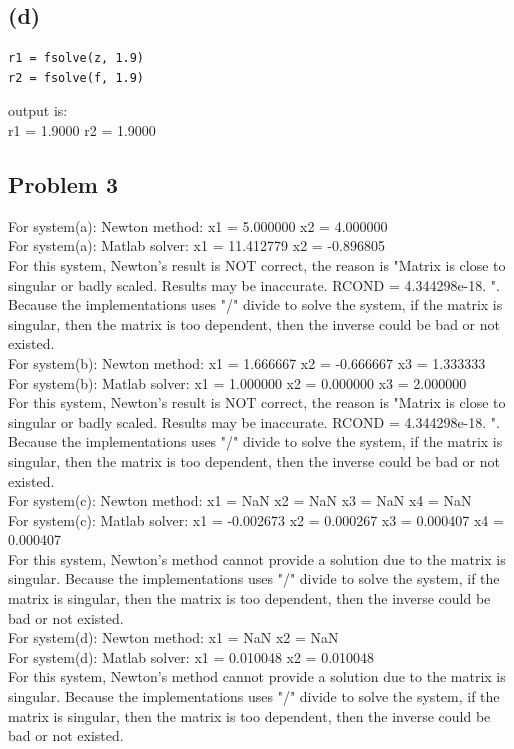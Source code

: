 \documentclass[11pt,fleqn]{exam}
\begin{document}
\subsection*{(d)}
\begin{lstlisting}
r1 = fsolve(z, 1.9)
r2 = fsolve(f, 1.9)
\end{lstlisting}
output is: \\
r1 = 1.9000
r2 = 1.9000

\subsection*{Problem 3}
For system(a): Newton method: x1 = 5.000000 x2 = 4.000000\\
For system(a): Matlab solver: x1 = 11.412779 x2 = -0.896805\\
For this system, Newton's result is NOT correct, the reason is "Matrix is close to singular or badly scaled. Results may be inaccurate.  RCOND =
4.344298e-18. ".  Because the implementations uses "/" divide to solve the system, if the matrix is singular, then the matrix is too dependent, then the inverse could be bad or not existed.\\

\noindent
For system(b): Newton method: x1 = 1.666667 x2 = -0.666667
 x3 = 1.333333\\
For system(b): Matlab solver: x1 = 1.000000 x2 = 0.000000
 x3 = 2.000000\\
 For this system, Newton's result is NOT correct, the reason is "Matrix is close to singular or badly scaled. Results may be inaccurate.  RCOND =
4.344298e-18. ".  Because the implementations uses "/" divide to solve the system, if the matrix is singular, then the matrix is too dependent, then the inverse could be bad or not existed.\\
 
\noindent
For system(c): Newton method: x1 = NaN x2 = NaN x3 = NaN x4 = NaN\\
For system(c): Matlab solver: x1 = -0.002673 x2 = 0.000267 x3 = 0.000407 x4 = 0.000407\\
 For this system, Newton's method cannot provide a solution due to the matrix is singular. Because the implementations uses "/" divide to solve the system, if the matrix is singular, then the matrix is too dependent, then the inverse could be bad or not existed.\\

\noindent
For system(d): Newton method: x1 = NaN x2 = NaN\\
For system(d): Matlab solver: x1 = 0.010048 x2 = 0.010048\\
For this system, Newton's method cannot provide a solution due to the matrix is singular. Because the implementations uses "/" divide to solve the system, if the matrix is singular, then the matrix is too dependent, then the inverse could be bad or not existed.\\
\end{document}
